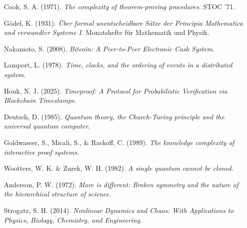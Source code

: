 \documentclass[11pt]{article}
\begin{document}
\begin{thebibliography}{10}

Cook, S. A. (1971). \emph{The complexity of theorem-proving procedures.} STOC '71.

Gödel, K. (1931). \emph{\"Uber formal unentscheidbare Sätze der Principia Mathematica und verwandter Systeme I.} Monatshefte f\"ur Mathematik und Physik.

Nakamoto, S. (2008). \emph{Bitcoin: A Peer-to-Peer Electronic Cash System.}

Lamport, L. (1978). \emph{Time, clocks, and the ordering of events in a distributed system.}

Houk, N. J. (2025). \emph{Timeproof: A Protocol for Probabilistic Verification via Blockchain Timestamps.}

Deutsch, D. (1985). \emph{Quantum theory, the Church-Turing principle and the universal quantum computer.}

Goldwasser, S., Micali, S., \& Rackoff, C. (1989). \emph{The knowledge complexity of interactive proof systems.}

Wootters, W. K. \& Zurek, W. H. (1982). \emph{A single quantum cannot be cloned.}

Anderson, P. W. (1972). \emph{More is different: Broken symmetry and the nature of the hierarchical structure of science.}

Strogatz, S. H. (2014). \emph{Nonlinear Dynamics and Chaos: With Applications to Physics, Biology, Chemistry, and Engineering.}

\end{thebibliography}
\end{document}
